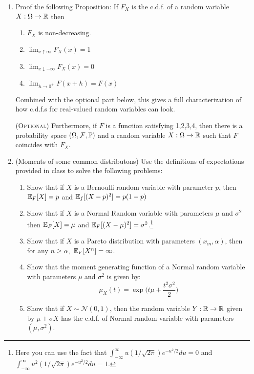 \documentclass[11pt]{article} %
\begin{document}
\begin{enumerate}
\item Proof the following Proposition: If $F_{X}$ is the c.d.f. of a random variable $X: \Omega \rightarrow \mathbb{R}$ then 
\begin{enumerate}
\item $F_{X}$ is non-decreasing.
\item $\lim_{x \uparrow \infty} F_{X}(x)=1$
\item $\lim_{x \downarrow -\infty} F_{X}(x)=0$
\item $\lim_{h \rightarrow 0^{+}} F(x+h)=F(x)$
\end{enumerate}

 Combined with the optional part below, this gives a full characterization of how c.d.f.s for real-valued random variables can look.

\noindent ({\scshape Optional}) Furthermore, if $F$ is a function satisfying 1,2,3,4, then there is a probability space $(\Omega, \mathcal{F}, \mathbb{P})$ and a random variable $X: \Omega \rightarrow \mathbb{R}$ such that $F$ coincides with $F_{X}$. 

\item (Moments of some common distributons) Use the definitions of expectations provided in class to solve the following problems:
\begin{enumerate}
\item Show that if $X$ is a Bernoulli random variable with parameter $p$, then $\mathbb{E}_{F}[X]=p$ and $\mathbb{E}_{f}[(X-p)^2]=p(1-p)$
\item Show that if $X$ is a Normal Random variable with parameters $\mu$ and $\sigma^2$ then $\mathbb{E}_{F}[X]=\mu$ and $\mathbb{E}_{F}[(X-\mu)^2]=\sigma^2$.\footnote{Here you can use the fact that $\int_{-\infty}^{\infty} u (1/\sqrt{2 \pi}) e^{-u^2/2} du =0$ and $\int_{-\infty}^{\infty} u^2 (1/\sqrt{2 \pi}) e^{-u^2/2} du =1$.} 
\item Show that if $X$ is a Pareto distribution with parameters $(x_m, \alpha)$, then for any $n \geq \alpha,$ $\mathbb{E}_{F}[X^{n}]=\infty$. 
\item Show that the moment generating function of a Normal random variable with parameters $\mu$ and $\sigma^2$ is given by:
$$\mu_{X}(t)= \exp \Big( t \mu + \frac{t^2 \sigma^2}{2}  \Big)  $$

\item Show that if $X \sim \mathcal{N}(0,1)$, then the random variable $Y:\mathbb{R} \rightarrow \mathbb{R}$ given by $\mu + \sigma X$ has the c.d.f. of Normal random variable with parameters $(\mu, \sigma^2)$. 


\end{enumerate}
\end{enumerate}
\end{document}
